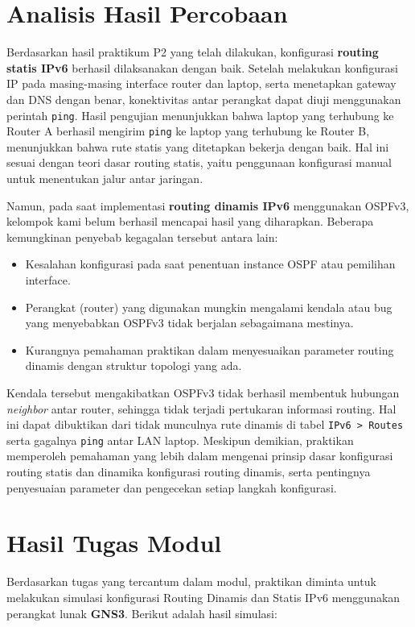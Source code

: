 \section{Analisis Hasil Percobaan}
Berdasarkan hasil praktikum P2 yang telah dilakukan, konfigurasi \textbf{routing statis IPv6} berhasil dilaksanakan dengan baik. Setelah melakukan konfigurasi IP pada masing-masing interface router dan laptop, serta menetapkan gateway dan DNS dengan benar, konektivitas antar perangkat dapat diuji menggunakan perintah \texttt{ping}. Hasil pengujian menunjukkan bahwa laptop yang terhubung ke Router A berhasil mengirim \texttt{ping} ke laptop yang terhubung ke Router B, menunjukkan bahwa rute statis yang ditetapkan bekerja dengan baik. Hal ini sesuai dengan teori dasar routing statis, yaitu penggunaan konfigurasi manual untuk menentukan jalur antar jaringan.

Namun, pada saat implementasi \textbf{routing dinamis IPv6} menggunakan OSPFv3, kelompok kami belum berhasil mencapai hasil yang diharapkan. Beberapa kemungkinan penyebab kegagalan tersebut antara lain:
\begin{itemize}
    \item Kesalahan konfigurasi pada saat penentuan instance OSPF atau pemilihan interface.
    \item Perangkat (router) yang digunakan mungkin mengalami kendala atau bug yang menyebabkan OSPFv3 tidak berjalan sebagaimana mestinya.
    \item Kurangnya pemahaman praktikan dalam menyesuaikan parameter routing dinamis dengan struktur topologi yang ada.
\end{itemize}

Kendala tersebut mengakibatkan OSPFv3 tidak berhasil membentuk hubungan \textit{neighbor} antar router, sehingga tidak terjadi pertukaran informasi routing. Hal ini dapat dibuktikan dari tidak munculnya rute dinamis di tabel \texttt{IPv6 > Routes} serta gagalnya \texttt{ping} antar LAN laptop. Meskipun demikian, praktikan memperoleh pemahaman yang lebih dalam mengenai prinsip dasar konfigurasi routing statis dan dinamika konfigurasi routing dinamis, serta pentingnya penyesuaian parameter dan pengecekan setiap langkah konfigurasi.

\section{Hasil Tugas Modul}
Berdasarkan tugas yang tercantum dalam modul, praktikan diminta untuk melakukan simulasi konfigurasi Routing Dinamis dan Statis IPv6 menggunakan perangkat lunak \textbf{GNS3}. Berikut adalah hasil simulasi:

